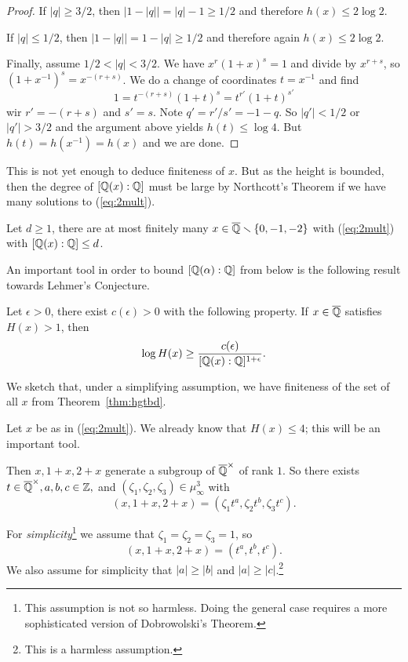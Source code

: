 \begin{proof}
  If $|q| \ge 3/2$, then $|1-|q|| = |q|-1\ge 1/2$ and therefore $h(x)\le
  2\log 2$.

  If $|q|\le 1/2$, then $|1-|q|| = 1-|q|\ge 1/2$ and therefore again
  $h(x)\le 2\log 2$.

  Finally, assume $1/2 < |q| < 3/2$. We have $x^r(1+x)^s=1$ and divide
  by $x^{r+s}$, so $(1+x^{-1})^s = x^{-(r+s)}$. We do a change of
  coordinates $t=x^{-1}$ and
  find $$1=t^{-(r+s)}(1+t)^s=t^{r'}(1+t)^{s'}$$
  wir $r'=-(r+s)$ and $s'=s$. Note $q'= r'/s'=-1-q$.
  So $|q'|< 1/2$ or $|q'|>3/2$ and the argument above yields $h(t)\le
  \log 4$.
  But $h(t)=h(x^{-1})=h(x)$ and we are done. 
\end{proof}

This is not yet enough to deduce finiteness of $x$.
But as the height is bounded, then the degree of
$[{\mathbb{Q}}(x):{\mathbb{Q}}]$ must be large by Northcott's Theorem if we have many
solutions to (\ref{eq:2mult}).

\begin{corollary}
  Let $d\ge 1$, there are at most finitely many
  $x\in{\overline{\mathbb{Q}}}\smallsetminus\{0,-1,-2\}$ with (\ref{eq:2mult}) with
  $[{\mathbb{Q}}(x):{\mathbb{Q}}]\le d$. 
\end{corollary}

An important tool in order to bound $[{\mathbb{Q}}(\alpha):{\mathbb{Q}}]$ from below is
the following result towards Lehmer's Conjecture.

\begin{theorem}[Dobrowolski]
  Let $\epsilon > 0$, there exist $c(\epsilon)>0$ with the following
  property.
  If $x\in{\overline{\mathbb{Q}}}$ satisfies $H(x) > 1$, then
  \begin{equation*}
    \log H(x) \ge \frac{c(\epsilon)}{[{\mathbb{Q}}(x):{\mathbb{Q}}]^{1+\epsilon}}. 
  \end{equation*}
\end{theorem}



We sketch that, under a simplifying assumption, we have finiteness of the set of
all $x$ from Theorem~\ref{thm:hgtbd}. 

Let $x$ be as in (\ref{eq:2mult}). We already know that $H(x)\le 4$;
this will be an important tool. 

Then $x,1+x,2+x$ generate a
subgroup of ${\overline{\mathbb{Q}}}^\times$ of rank $1$. So there exists $t\in
{\overline{\mathbb{Q}}}^\times, a,b,c\in{\mathbb{Z}},$ and
$(\zeta_1,\zeta_2,\zeta_3)\in\mu_\infty^3$  with 
$$
(x,1+x,2+x) = (\zeta_1 t^a, \zeta_2 t^b,\zeta_3 t^c).
$$

For \emph{simplicity}\footnote{This assumption is not so harmless.
  Doing the general case requires a more sophisticated version of
  Dobrowolski's Theorem.} we assume that
$\zeta_1=\zeta_2=\zeta_3=1$, so
$$
(x,1+x,2+x) = (t^a, t^b,t^c).
$$
We also assume for simplicity that $|a|\ge |b|$ and $|a|\ge
|c|$.\footnote{This is a harmless assumption.}

